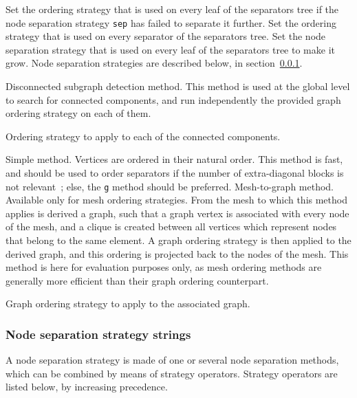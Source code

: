 \begin{itemize}
\begin{itemize}
\iteme[{\tt ole=}{\it strat}]
Set the ordering strategy that is used on every leaf of the separators tree
if the node separation strategy {\tt sep} has failed to separate it further.
\iteme[{\tt ose=}{\it strat}]
Set the ordering strategy that is used on every separator of the separators
tree.
\iteme[{\tt sep=}{\it strat}]
Set the node separation strategy that is used on every leaf of the
separators tree to make it grow. Node separation strategies are
described below, in section~\ref{sec-lib-format-nsep}.
\end{itemize}
\iteme[{\tt o}]
Disconnected subgraph detection method. This method is used at the
global level to search for connected components, and run independently
the provided graph ordering strategy on each of them.
\begin{itemize}
\iteme[{\tt strat=}{\it strat}]
Ordering strategy to apply to each of the connected components.
\end{itemize}
\iteme[{\tt s}]
Simple method. Vertices are ordered in their natural order. This
method is fast, and should be used to order separators if the number
of extra-diagonal blocks is not relevant~; else, the {\tt g} method
should be preferred.
\iteme[{\tt v}]
Mesh-to-graph method. Available only for mesh ordering strategies.
From the mesh to which this method applies is derived a graph,
such that a graph vertex is associated with every node of the
mesh, and a clique is created between all vertices which represent
nodes that belong to the same element. A graph ordering strategy is
then applied to the derived graph, and this ordering is projected
back to the nodes of the mesh. This method is here for evaluation
purposes only, as mesh ordering methods are generally more
efficient than their graph ordering counterpart.
\begin{itemize}
\iteme[{\tt strat=}{\it strat}]
Graph ordering strategy to apply to the associated graph.
\end{itemize}
\end{itemize}

\subsubsection{Node separation strategy strings}
\label{sec-lib-format-nsep}

A node separation strategy is made of one or several node separation
methods, which can be combined by means of strategy
operators. Strategy operators are listed below, by increasing
precedence.

